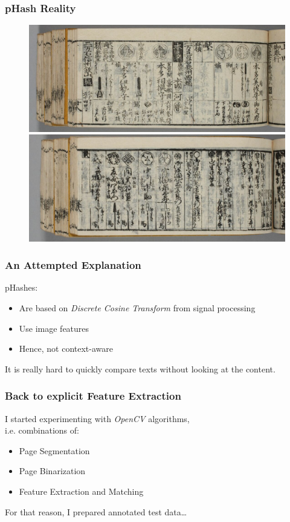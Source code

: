 \documentclass{beamer}
\begin{document}
  \begin{frame}
    \frametitle{pHash Reality}
    \begin{figure}
      \centering
      \includegraphics{200019601_00059}
      \includegraphics{200019602_00127}
    \end{figure}
  \end{frame}

  \begin{frame}
    \frametitle{An Attempted Explanation}
    pHashes:
    \begin{itemize}
      \item Are based on \emph{Discrete Cosine Transform} from signal processing
      \item Use image features
      \item Hence, not \alert{context-aware}
    \end{itemize}

    \bigskip
    
    It is really hard to quickly compare texts without looking at the content.
  \end{frame}
  
  \begin{frame}
    \frametitle{Back to explicit Feature Extraction}
    I started experimenting with \emph{OpenCV} algorithms,\\i.e. combinations of:
    \begin{itemize}
      \item Page Segmentation
      \item Page Binarization
      \item Feature Extraction and Matching
    \end{itemize}

    \bigskip
    For that reason, I prepared annotated test data…
  \end{frame}
  
\end{document}
